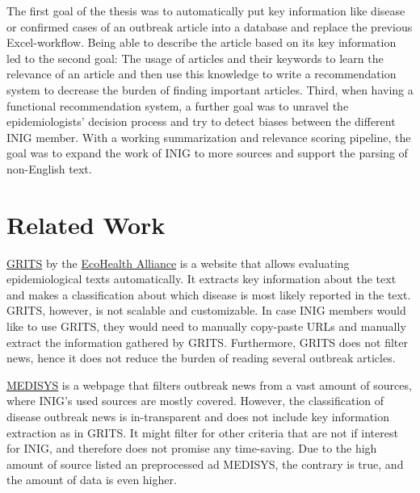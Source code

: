 The first goal of the thesis was to automatically put key information like disease or confirmed cases of an outbreak article into a database and replace the previous Excel-workflow. Being able to describe the article based on its key information led to the second goal: The usage of articles and their keywords to learn the relevance of an article and then use this knowledge to write a recommendation system to decrease the burden of finding important articles.
Third, when having a functional recommendation system, a further goal was to unravel the epidemiologists' decision process and try to detect biases between the different INIG member.
With a working summarization and relevance scoring pipeline, the goal was to expand the work of INIG to more sources and support the parsing of non-English text.


\section{Related Work}
\href{https://grits.eha.io}{GRITS} by the \href{https://www.ecohealthalliance.org}{EcoHealth Alliance} is a website that allows evaluating epidemiological texts automatically. It extracts key information about the text and makes a classification about which disease is most likely reported in the text. GRITS, however, is not scalable and customizable. In case INIG members would like to use GRITS, they would need to manually copy-paste URLs and manually extract the information gathered by GRITS. Furthermore, GRITS does not filter news, hence it does not reduce the burden of reading several outbreak articles.

\href{http://medisys.newsbrief.eu}{MEDISYS} is a webpage that filters outbreak news from a vast amount of sources, where INIG's used sources are mostly covered. However, the classification of disease outbreak news is in-transparent and does not include key information extraction as in GRITS. It might filter for other criteria that are not if interest for INIG, and therefore does not promise any time-saving. Due to the high amount of source listed an preprocessed ad MEDISYS, the contrary is true, and the amount of data is even higher.
